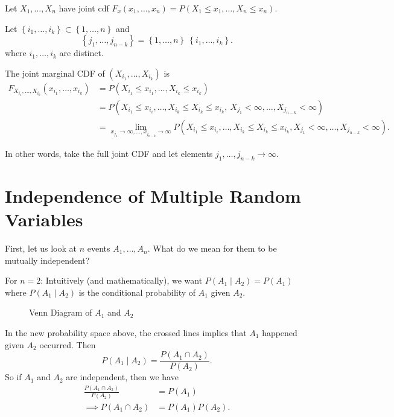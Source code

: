 
\begin{definition}
	Let $X_1, \ldots, X_{n}$ have joint cdf $F_{x}\left( x_1, \ldots, x_{n} \right)  = P \left( X_{1} \le x_1, \ldots, X_{n}\le x_{n} \right) $. 

	Let $\left\{ i_1, \ldots, i_{k} \right\} \subset \left\{ 1,\ldots,n \right\} $ and 
	\[
	\left\{ j_1, \ldots, j_{n-k} \right\} = \left\{ 1, \ldots, n \right\} \ \left\{ i_1, \ldots, i_{k} \right\} 
	.\] 
	where $i_1, \ldots, i_{k}$ are distinct. 

	The joint marginal CDF of  $\left( X_{i_1} ,\ldots, X_{i_{k}} \right) $ is 
	\begin{align*}
		F_{X_{i_1}, \ldots, X_{i_{k}}}\left( x_{i_{1}}, \ldots, x_{i_{k}} \right) 
		&= P\left( X_{i_{1}} \le  x_{i_{1}}, \ldots, X_{i_{k}} \le  x _{i_{k}} \right) \\ 
		&= P\left( X_{i_{1}} \le  x_{i_{i}} ,\ldots, X_{i_{k}} \le X_{i_{k}} \le x_{i_{k}}, \
		X_{j_{1}} < \infty, \ldots, X _{j_{n-k}} < \infty \right)  \\
	        &=  \lim_{x_{j_{1}} \to \infty, \ldots , x_{j_{n - k}} \to \infty} P\left( X_{i_{1}} \le  x_{i_{i}} ,\ldots, X_{i_{k}} \le X_{i_{k}} \le x_{i_{k}}, X_{j_{1}} < \infty, \ldots, X _{j_{n-k}} < \infty \right) 
	.\end{align*}

	In other words, take the full joint CDF and let elements $j_1, \ldots, j_{n - k} \to \infty$. 
\end{definition}

\section{Independence of Multiple Random Variables}

First, let us look at $n$ events $A_1, \ldots, A_{n}$. What do we mean for them to be mutually independent?

For $n = 2$: Intuitively (and mathematically), we want $P\left( A_1  \mid A_2\right) = P\left( A_1 \right) $ where $P\left( A_1 \mid A_2 \right) $ is the conditional probability of $A_1$ given $A_2$. 

\begin{figure}[ht]
    \centering
    \caption{Venn Diagram of $A_{1}$ and $A_2$}
    \label{fig:venn-diagram-of-$-and-$ }
\end{figure}

In the new probability space above, the crossed lines implies that $A_1$ happened given $A_2$ occurred. Then
 \[
	 P\left( A_1 \mid A_2 \right)  = \frac{P\left( A_1 \cap A_2 \right) }{P\left( A_2 \right) }
.\]
So if $A_1$ and $A_2$ are independent, then we have 
\begin{align*}
	\frac{P\left( A_1 \cap A_2 \right) }{P\left( A_2 \right) } &= P\left( A_1 \right)  \\
	\implies P\left( A_1 \cap A_2 \right)  &= P\left( A_1 \right) P\left(A_2 \right) 
.\end{align*}

